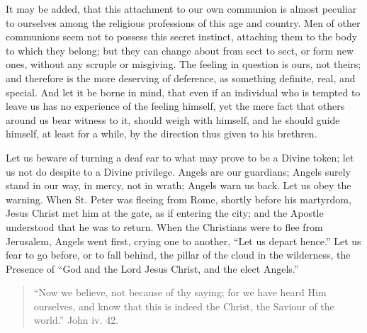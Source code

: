 It may be added, that this attachment to our own communion is
almost peculiar to ourselves among the religious professions of this
age and country. Men of other communions seem not to possess this
secret instinct, attaching them to the body to which they belong; but
they can change about from sect to sect, or form new ones, without any
scruple or misgiving. The feeling in question is ours, not theirs; and
therefore is the more deserving of deference, as something definite,
real, and special. And let it be borne in mind, that even if an
individual who is tempted to leave us has no experience of the feeling
himself, yet the mere fact that others around us bear witness to it,
should weigh with himself, and he should guide himself, at least for a
while, by the direction thus given to his brethren.

Let us beware of turning a deaf ear to what may prove to be a
Divine token; let us not do despite to a Divine privilege. Angels are
our guardians; Angels surely stand in our way, in mercy, not in wrath;
Angels warn us back. Let us obey the warning. When St. Peter was
fleeing from Rome, shortly before his martyrdom, Jesus Christ met him
at the gate, as if entering the city; and the Apostle understood that
he was to return. When the Christians were to flee from Jerusalem,
Angels went first, crying one to another, ``Let us depart
hence.'' Let us fear to go before, or to fall behind, the pillar
of the cloud in the wilderness, the Presence of ``God and the Lord
Jesus Christ, and the elect Angels.''


\begin{quote}

``Now we believe, not because of thy saying; for we have
heard Him ourselves, and know that this is indeed the Christ, the
Saviour of the world.'' John iv. 42.

\end{quote}

